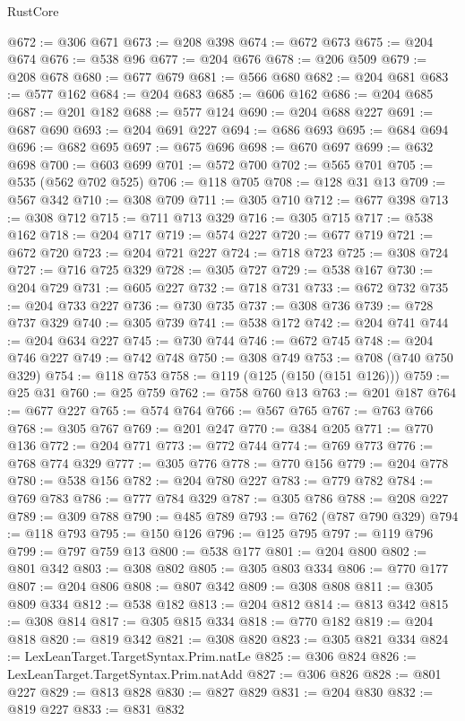 \begin{lexlean}{RustCore}
\begin{coremodule}
@672 := @306 @671
@673 := @208 @398
@674 := @672 @673
@675 := @204 @674
@676 := @538 @96
@677 := @204 @676
@678 := @206 @509
@679 := @208 @678
@680 := @677 @679
@681 := @566 @680
@682 := @204 @681
@683 := @577 @162
@684 := @204 @683
@685 := @606 @162
@686 := @204 @685
@687 := @201 @182
@688 := @577 @124
@690 := @204 @688 @227
@691 := @687 @690
@693 := @204 @691 @227
@694 := @686 @693
@695 := @684 @694
@696 := @682 @695
@697 := @675 @696
@698 := @670 @697
@699 := @632 @698
@700 := @603 @699
@701 := @572 @700
@702 := @565 @701
@705 := @535 (@562 @702 @525)
@706 := @118 @705
@708 := @128 @31 @13
@709 := @567 @342
@710 := @308 @709
@711 := @305 @710
@712 := @677 @398
@713 := @308 @712
@715 := @711 @713 @329
@716 := @305 @715
@717 := @538 @162
@718 := @204 @717
@719 := @574 @227
@720 := @677 @719
@721 := @672 @720
@723 := @204 @721 @227
@724 := @718 @723
@725 := @308 @724
@727 := @716 @725 @329
@728 := @305 @727
@729 := @538 @167
@730 := @204 @729
@731 := @605 @227
@732 := @718 @731
@733 := @672 @732
@735 := @204 @733 @227
@736 := @730 @735
@737 := @308 @736
@739 := @728 @737 @329
@740 := @305 @739
@741 := @538 @172
@742 := @204 @741
@744 := @204 @634 @227
@745 := @730 @744
@746 := @672 @745
@748 := @204 @746 @227
@749 := @742 @748
@750 := @308 @749
@753 := @708 (@740 @750 @329)
@754 := @118 @753
@758 := @119 (@125 (@150 (@151 @126)))
@759 := @25 @31
@760 := @25 @759
@762 := @758 @760 @13
@763 := @201 @187
@764 := @677 @227
@765 := @574 @764
@766 := @567 @765
@767 := @763 @766
@768 := @305 @767
@769 := @201 @247
@770 := @384 @205
@771 := @770 @136
@772 := @204 @771
@773 := @772 @744
@774 := @769 @773
@776 := @768 @774 @329
@777 := @305 @776
@778 := @770 @156
@779 := @204 @778
@780 := @538 @156
@782 := @204 @780 @227
@783 := @779 @782
@784 := @769 @783
@786 := @777 @784 @329
@787 := @305 @786
@788 := @208 @227
@789 := @309 @788
@790 := @485 @789
@793 := @762 (@787 @790 @329)
@794 := @118 @793
@795 := @150 @126
@796 := @125 @795
@797 := @119 @796
@799 := @797 @759 @13
@800 := @538 @177
@801 := @204 @800
@802 := @801 @342
@803 := @308 @802
@805 := @305 @803 @334
@806 := @770 @177
@807 := @204 @806
@808 := @807 @342
@809 := @308 @808
@811 := @305 @809 @334
@812 := @538 @182
@813 := @204 @812
@814 := @813 @342
@815 := @308 @814
@817 := @305 @815 @334
@818 := @770 @182
@819 := @204 @818
@820 := @819 @342
@821 := @308 @820
@823 := @305 @821 @334
@824 := LexLeanTarget.TargetSyntax.Prim.natLe
@825 := @306 @824
@826 := LexLeanTarget.TargetSyntax.Prim.natAdd
@827 := @306 @826
@828 := @801 @227
@829 := @813 @828
@830 := @827 @829
@831 := @204 @830
@832 := @819 @227
@833 := @831 @832

\end{coremodule}
\end{lexlean}
